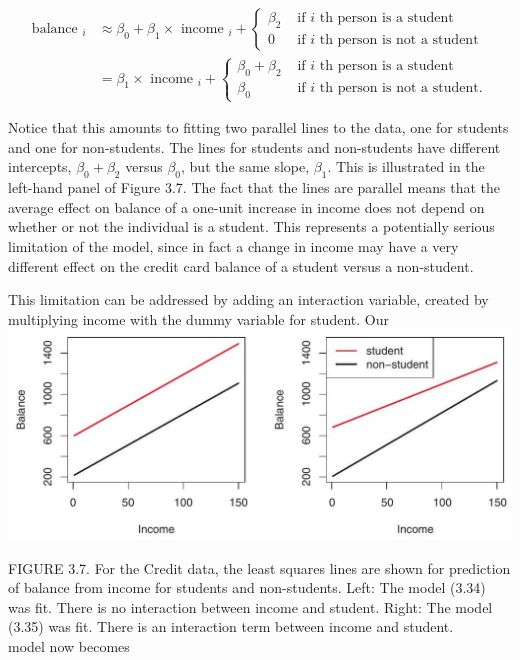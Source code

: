 \documentclass[10pt]{article}
\begin{document}
\begin{align*}
\text { balance }_{i} & \approx \beta_{0}+\beta_{1} \times \text { income }_{i}+ \begin{cases}\beta_{2} & \text { if } i \text { th person is a student } \\
0 & \text { if } i \text { th person is not a student }\end{cases} \\
& =\beta_{1} \times \text { income }_{i}+ \begin{cases}\beta_{0}+\beta_{2} & \text { if } i \text { th person is a student } \\
\beta_{0} & \text { if } i \text { th person is not a student. }\end{cases} \tag{3.34}
\end{align*}


Notice that this amounts to fitting two parallel lines to the data, one for students and one for non-students. The lines for students and non-students have different intercepts, $\beta_{0}+\beta_{2}$ versus $\beta_{0}$, but the same slope, $\beta_{1}$. This is illustrated in the left-hand panel of Figure 3.7. The fact that the lines are parallel means that the average effect on balance of a one-unit increase in income does not depend on whether or not the individual is a student. This represents a potentially serious limitation of the model, since in fact a change in income may have a very different effect on the credit card balance of a student versus a non-student.

This limitation can be addressed by adding an interaction variable, created by multiplying income with the dummy variable for student. Our\\
\includegraphics[max width=\textwidth, center]{2025_05_05_efe77898333945044de4g-105}

FIGURE 3.7. For the Credit data, the least squares lines are shown for prediction of balance from income for students and non-students. Left: The model (3.34) was fit. There is no interaction between income and student. Right: The model (3.35) was fit. There is an interaction term between income and student.\\
model now becomes
\end{document}
